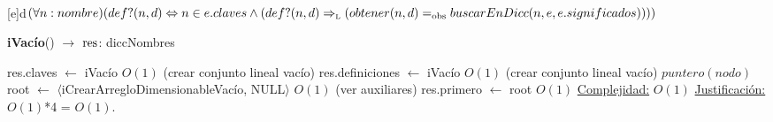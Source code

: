 \begin{Representacion}
   ~

   [e]{d}{$(\forall n: nombre) (def?(n,d) \Leftrightarrow n \in e.claves \land (def?(n,d) \Rightarrow_{\mathrm{\scriptscriptstyle{L}}} (obtener(n,d) =_{\mathrm{obs}} buscarEnDicc(n,e,e.significados))))$}
   

\end{Representacion}

\clearpage

\begin{Algoritmos}

\begin{algorithm}[H]{\textbf{iVacío}() $\to$ $\res$: diccNombres}
	\begin{algorithmic}
        \State res.claves $\gets$ iVacío \Comment $O(1)$ (crear conjunto lineal vacío)
        \State res.definiciones $\gets$ iVacío \Comment $O(1)$ (crear conjunto lineal vacío)
        \State $puntero(nodo)$ root $\gets$  $\langle$iCrearArregloDimensionableVacío, NULL$\rangle$ \Comment $O(1)$ (ver auxiliares)
        \State res.primero $\gets$ root \Comment $O(1)$
	\Statex \underline{Complejidad:} $O(1)$
	\Statex \underline{Justificación:} $O(1)$*4 = $O(1)$.
	\end{algorithmic}
\end{algorithm}


\end{Algoritmos}
